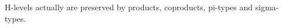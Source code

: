 \begin{code}%
%
\>[2]\<%
\\
\>[2][@{}l@{\AgdaIndent{0}}]%
\>[4]\AgdaSymbol{:}\AgdaSpace{}%
\AgdaSymbol{\{}\AgdaSpace{}%
\AgdaSymbol{:}\AgdaSpace{}%
\AgdaSpace{}%
\AgdaSymbol{\}}\<%
\\
%
\>[4]\AgdaSpace{}%
\AgdaSymbol{(}\AgdaSpace{}%
\AgdaSymbol{:}\AgdaSpace{}%
\AgdaSpace{}%
\AgdaSpace{}%
\AgdaSpace{}%
\AgdaSymbol{\{}\AgdaSymbol{\})}\<%
\\
%
\>[4]\AgdaSpace{}%
\AgdaSpace{}%
\AgdaSymbol{\{}\AgdaSpace{}%
\AgdaSymbol{\}}\AgdaSpace{}%
\AgdaSpace{}%
\AgdaSpace{}%
\AgdaSymbol{\{}\AgdaSpace{}%
\AgdaSymbol{:}\AgdaSpace{}%
\AgdaSpace{}%
\AgdaSpace{}%
\AgdaSymbol{\}}\<%
\\
%
\>[4]\AgdaComment{------------------------------}\<%
\\
%
\>[4]\AgdaSpace{}%
\AgdaSpace{}%
\AgdaSpace{}%
\AgdaSpace{}%
\AgdaFunction{[}\AgdaSpace{}%
\AgdaSymbol{(}\AgdaFunction{\#}\AgdaSpace{}%
\AgdaSpace{}%
\AgdaSymbol{)}\AgdaSpace{}%
\AgdaFunction{/}\AgdaSpace{}%
\AgdaSpace{}%
\AgdaFunction{]}\<%
\\
%
\\[\AgdaEmptyExtraSkip]%
%
\>[2]\AgdaSpace{}%
\AgdaSpace{}%
\AgdaSymbol{\{}\AgdaSymbol{\}}\AgdaSpace{}%
\AgdaSpace{}%
\AgdaSpace{}%
\AgdaSymbol{\{}\AgdaSpace{}%
\AgdaSymbol{=}\AgdaSpace{}%
\AgdaSymbol{\}}\AgdaSpace{}%
\AgdaSymbol{=}\AgdaSpace{}%
\AgdaSpace{}%
\AgdaSymbol{(}\AgdaSpace{}%
\AgdaSymbol{)}\AgdaSpace{}%
\AgdaSpace{}%
\<%
\end{code}

H-levels actually are preserved by products, coproducts, pi-types and sigma-types.


